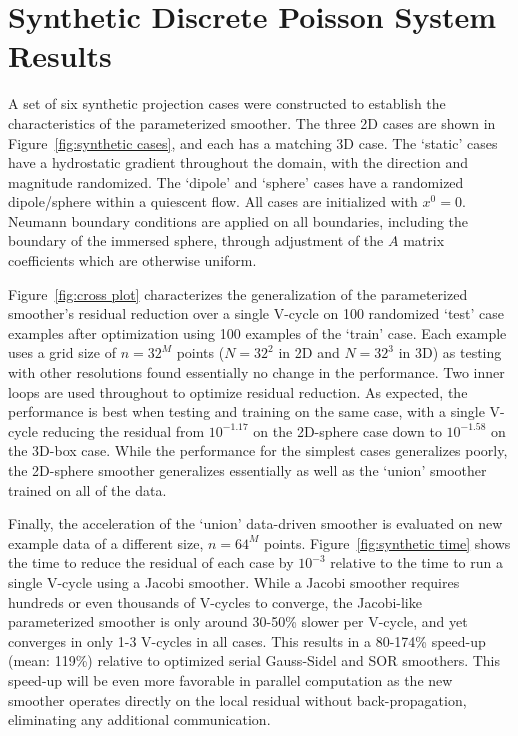 \documentclass[review]{elsarticle}
\begin{document}
\section{Synthetic Discrete Poisson System Results}

A set of six synthetic projection cases were constructed to establish the characteristics of the parameterized smoother. The three 2D cases are shown in Figure~\ref{fig:synthetic cases}, and each has a matching 3D case. The `static' cases have a hydrostatic gradient throughout the domain, with the direction and magnitude randomized. The `dipole' and `sphere' cases have a randomized dipole/sphere within a quiescent flow. All cases are initialized with $x^0=0$.
Neumann boundary conditions are applied on all boundaries, including the boundary of the immersed sphere, through adjustment of the $A$ matrix coefficients which are otherwise uniform. 

Figure~\ref{fig:cross plot} characterizes the generalization of the parameterized smoother's residual reduction over a single V-cycle on 100 randomized `test' case examples after optimization using 100 examples of the `train' case. Each example uses a grid size of $n=32^M$ points ($N=32^2$ in 2D and $N=32^3$ in 3D) as testing with other resolutions found essentially no change in the performance. Two inner loops are used throughout to optimize residual reduction. As expected, the performance is best when testing and training on the same case, with a single V-cycle reducing the residual from $10^{-1.17}$ on the 2D-sphere case down to $10^{-1.58}$ on the 3D-box case. While the performance for the simplest cases generalizes poorly, the 2D-sphere smoother generalizes essentially as well as the `union' smoother trained on all of the data. 

Finally, the acceleration of the `union' data-driven smoother is evaluated on new example data of a different size, $n=64^M$ points. Figure~\ref{fig:synthetic time} shows the time to reduce the residual of each case by $10^{-3}$ relative to the time to run a single V-cycle using a Jacobi smoother. While a Jacobi smoother requires  hundreds or even thousands of V-cycles to converge, the Jacobi-like parameterized smoother is only around 30-50\% slower per V-cycle, and yet converges in only 1-3 V-cycles in all cases. This results in a 80-174\% speed-up (mean: 119\%) relative to optimized serial Gauss-Sidel and SOR smoothers. This speed-up will be even more favorable in parallel computation as the new smoother operates directly on the local residual without back-propagation, eliminating any additional communication.
\end{document}
